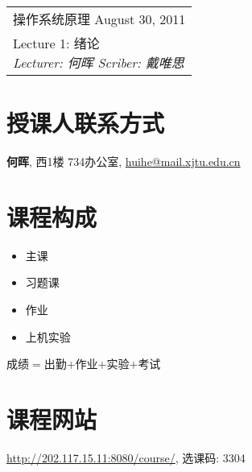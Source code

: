 \clearpage \noindent\begin{tabularx}{\linewidth}{|X|}
\hline \vskip -2mm
{\sf 操作系统原理} \hfill August 30, 2011 \\
{\centering \sf \large Lecture 1:
绪论 \\ }
\textsl{Lecturer: 何晖 \hfill Scriber: 戴唯思}\\ \hline
\end{tabularx}
\setcounter{section}{0}
\renewcommand{\thepage}{\lecture -\arabic{page}}
\def\lecture{1}

\section{授课人联系方式}

    \textbf{何晖}, 西1楼 734办公室, \url{huihe@mail.xjtu.edu.cn}

\section{课程构成}

    \begin{itemize}
        \item 主课
        \item 习题课
        \item 作业
        \item 上机实验
    \end{itemize}

    成绩$=$出勤$+$作业$+$实验$+$考试

\section{课程网站}

    \url{http://202.117.15.11:8080/course/}, 选课码: 3304
